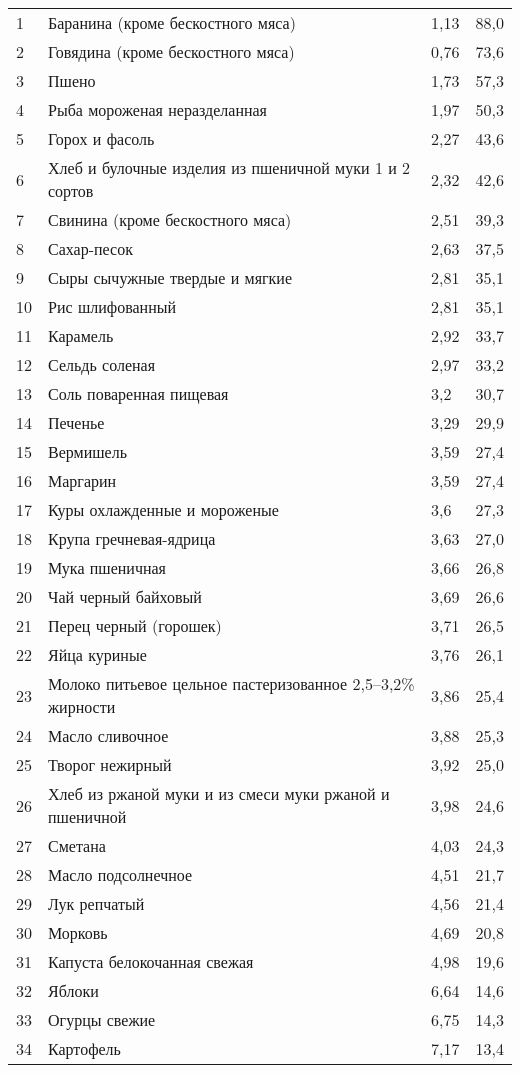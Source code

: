 \begin{longtable}{|p{1cm}|p{8.5cm}|p{3.5cm}|p{3cm}|}
	\footnotesize %
	1   & Баранина (кроме бескостного мяса) & 1,13 & 88,0 \\
	2   & Говядина (кроме бескостного мяса) & 0,76 & 73,6 \\
	3   & Пшено & 1,73 & 57,3 \\
	4   & Рыба мороженая неразделанная & 1,97 & 50,3 \\
	5   & Горох и фасоль & 2,27 & 43,6 \\
	6   & Хлеб и булочные изделия из пшеничной муки 1 и 2 сортов & 2,32 & 42,6 \\
	7   & Свинина (кроме бескостного мяса) & 2,51 & 39,3 \\
	8   & Сахар-песок & 2,63 & 37,5 \\
	9   & Сыры сычужные твердые и мягкие & 2,81 & 35,1 \\
	10  & Рис шлифованный & 2,81 & 35,1 \\
	11  & Карамель & 2,92 & 33,7 \\
	12  & Сельдь соленая & 2,97 & 33,2 \\
	13  & Соль поваренная пищевая & 3,2 & 30,7 \\
	14  & Печенье & 3,29 & 29,9 \\
	15  & Вермишель & 3,59 & 27,4 \\
	16  & Маргарин & 3,59 & 27,4 \\
	17  & Куры охлажденные и мороженые & 3,6 & 27,3 \\
	18  & Крупа гречневая-ядрица & 3,63 & 27,0 \\
	19  & Мука пшеничная & 3,66 & 26,8 \\
	20  & Чай черный байховый & 3,69 & 26,6 \\
	21  & Перец черный (горошек) & 3,71 & 26,5 \\
	22  & Яйца куриные & 3,76 & 26,1 \\
	23  & Молоко питьевое цельное пастеризованное 2,5--3,2\% жирности & 3,86 & 25,4 \\
	24  & Масло сливочное & 3,88 & 25,3 \\
	25  & Творог нежирный & 3,92 & 25,0 \\
	26  & Хлеб из ржаной муки и из смеси муки ржаной и пшеничной & 3,98 & 24,6 \\
	27  & Сметана & 4,03 & 24,3 \\
	28  & Масло подсолнечное & 4,51 & 21,7 \\
	29  & Лук репчатый & 4,56 & 21,4 \\
	30  & Морковь & 4,69 & 20,8 \\
	31  & Капуста белокочанная свежая & 4,98 & 19,6 \\
	32  & Яблоки & 6,64 & 14,6 \\
	33  & Огурцы свежие & 6,75 & 14,3 \\
	34  & Картофель & 7,17 & 13,4 \\
	
\end{longtable}

